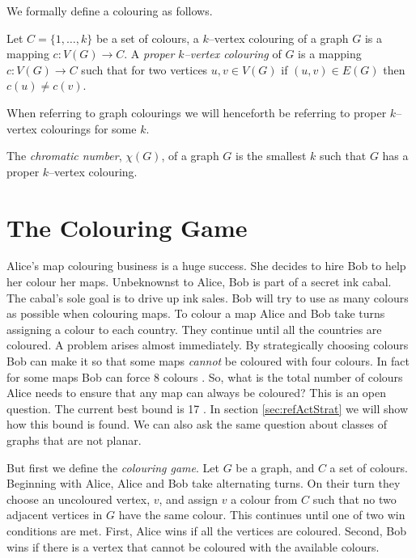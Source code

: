 We formally define a colouring as follows.
\begin{definition}
Let $C=\{1,\dots,k\}$ be a set of colours, a $k$--vertex colouring of a graph $G$ is a mapping $c\colon V(G) \to C$. A \textit{proper $k$--vertex colouring} of $G$ is a mapping $c\colon V(G) \to C$ such that for two vertices $u,v\in V(G)$ if $(u,v)\in E(G)$ then $c(u)\neq c(v)$. 
\end{definition}
When referring to graph colourings we will henceforth be referring to proper $k$--vertex colourings for some $k$. 
\begin{definition}
The \textit{chromatic number}, $\chi(G)$, of a graph $G$ is the smallest $k$ such that $G$ has a proper $k$--vertex colouring.
\end{definition} 

\section{The Colouring Game} \label{sec:colouring_game}
Alice's map colouring business is a huge success. She decides to hire Bob to help her colour her maps. Unbeknownst to Alice, Bob is part of a secret ink cabal. The cabal's sole goal is to drive up ink sales. Bob will try to use as many colours as possible when colouring maps. To colour a map Alice and Bob take turns assigning a colour to each country. They continue until all the countries are coloured. A problem arises almost immediately. By strategically choosing colours Bob can make it so that some maps \textit{cannot} be coloured with four colours. In fact for some maps Bob can force 8 colours \cite{kierstead1994planar}. So, what is the total number of colours Alice needs to ensure that any map can always be coloured? This is an open question. The current best bound is 17 \cite{Zhu2008}. In section \ref{sec:refActStrat} we will show how this bound is found. We can also ask the same question about classes of graphs that are not planar. 

But first we define the \textit{colouring game}. Let $G$ be a graph, and $C$ a set of colours. Beginning with Alice, Alice and Bob take alternating turns. On their turn they choose an uncoloured vertex, $v$, and assign $v$ a colour from $C$ such that no two adjacent vertices in $G$ have the same colour. This continues until one of two win conditions are met. First, Alice wins if all the vertices are coloured. Second, Bob wins if there is a vertex that cannot be coloured with the available colours.

